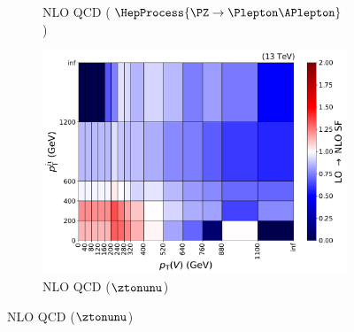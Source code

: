 \begin{figure}[htbp]
\begin{subfigure}[b]{0.32\textwidth}
        \caption{NLO QCD ($\HepProcess{\PZ \to \Plepton\APlepton}$)}
    \end{subfigure}
    \hfill
    \begin{subfigure}[b]{0.32\textwidth}
        \includegraphics[width=\textwidth]{figures/nlo_k_factors/2D_znunu.pdf}
        \caption{NLO QCD ($\ztonunu$)}
    \end{subfigure}


\end{figure}
